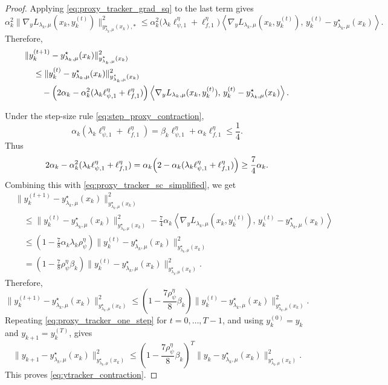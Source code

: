 \documentclass{article}
\begin{document}
\begin{proof}
Applying \eqref{eq:proxy_tracker_grad_sq} to the last term gives
\[
\alpha_k^2
\|\nabla_yL_{\lambda_k,\mu}(x_k,y_k^{(t)})\|_{y_{\lambda_k,\mu}^\star(x_k),*}^2
\le
\alpha_k^2
\bigl(\lambda_k\ell_{\psi,1}^\eta+\ell_{f,1}^\eta\bigr)
\left\langle
\nabla_yL_{\lambda_k,\mu}(x_k,y_k^{(t)}),
\,y_k^{(t)}-y_{\lambda_k,\mu}^\star(x_k)
\right\rangle .
\]
Therefore,
\begin{align*}
&\|y_k^{(t+1)}-y_{\lambda_k,\mu}^\star(x_k)\|_{y_{\lambda_k,\mu}^\star(x_k)}^2 \\
&\quad\le
\|y_k^{(t)}-y_{\lambda_k,\mu}^\star(x_k)\|_{y_{\lambda_k,\mu}^\star(x_k)}^2 \\
&\qquad
-
\Bigl(
2\alpha_k
-
\alpha_k^2(\lambda_k\ell_{\psi,1}^\eta+\ell_{f,1}^\eta)
\Bigr)
\left\langle
\nabla_yL_{\lambda_k,\mu}(x_k,y_k^{(t)}),
\,y_k^{(t)}-y_{\lambda_k,\mu}^\star(x_k)
\right\rangle .
\end{align*}

Under the step-size rule \eqref{eq:step_proxy_contraction},
\[
\alpha_k(\lambda_k\ell_{\psi,1}^{\eta}+\ell_{f,1}^{\eta})
=
\beta_k\ell_{\psi,1}^{\eta}
+
\alpha_k\ell_{f,1}^{\eta}
\le
\frac14.
\]
Thus
\[
2\alpha_k-\alpha_k^2(\lambda_k\ell_{\psi,1}^{\eta}+\ell_{f,1}^{\eta})
=
\alpha_k
\Bigl(
2-\alpha_k(\lambda_k\ell_{\psi,1}^{\eta}+\ell_{f,1}^{\eta})
\Bigr)
\ge
\frac{7}{4}\alpha_k .
\]
Combining this with \eqref{eq:proxy_tracker_sc_simplified}, we get
\begin{align*}
&\|y_k^{(t+1)}-y_{\lambda_k,\mu}^\star(x_k)\|_{y_{\lambda_k,\mu}^\star(x_k)}^2 \\
&\quad\le
\|y_k^{(t)}-y_{\lambda_k,\mu}^\star(x_k)\|_{y_{\lambda_k,\mu}^\star(x_k)}^2
-
\frac{7}{4}\alpha_k
\left\langle
\nabla_yL_{\lambda_k,\mu}(x_k,y_k^{(t)}),
\,y_k^{(t)}-y_{\lambda_k,\mu}^\star(x_k)
\right\rangle \\
&\quad\le
\left(1-\frac{7}{8}\alpha_k\lambda_k\rho_\psi^\eta\right)
\|y_k^{(t)}-y_{\lambda_k,\mu}^\star(x_k)\|_{y_{\lambda_k,\mu}^\star(x_k)}^2 \\
&\quad=
\left(1-\frac{7}{8}\rho_\psi^\eta\beta_k\right)
\|y_k^{(t)}-y_{\lambda_k,\mu}^\star(x_k)\|_{y_{\lambda_k,\mu}^\star(x_k)}^2 .
\end{align*}
Therefore,
\begin{equation}
\label{eq:proxy_tracker_one_step}
\|y_k^{(t+1)}-y_{\lambda_k,\mu}^\star(x_k)\|_{y_{\lambda_k,\mu}^\star(x_k)}^2
\le
\left(1-\frac{7\rho_\psi^\eta}{8}\beta_k\right)
\|y_k^{(t)}-y_{\lambda_k,\mu}^\star(x_k)\|_{y_{\lambda_k,\mu}^\star(x_k)}^2 .
\end{equation}
Repeating \eqref{eq:proxy_tracker_one_step} for \(t=0,\ldots,T-1\), and using
\(y_k^{(0)}=y_k\) and \(y_{k+1}=y_k^{(T)}\), gives
\[
\|y_{k+1}-y_{\lambda_k,\mu}^\star(x_k)\|_{y_{\lambda_k,\mu}^\star(x_k)}^2
\le
\left(1-\frac{7\rho_\psi^\eta}{8}\beta_k\right)^T
\|y_k-y_{\lambda_k,\mu}^\star(x_k)\|_{y_{\lambda_k,\mu}^\star(x_k)}^2 .
\]
This proves \eqref{eq:ytracker_contraction}.
\end{proof}
\end{document}
